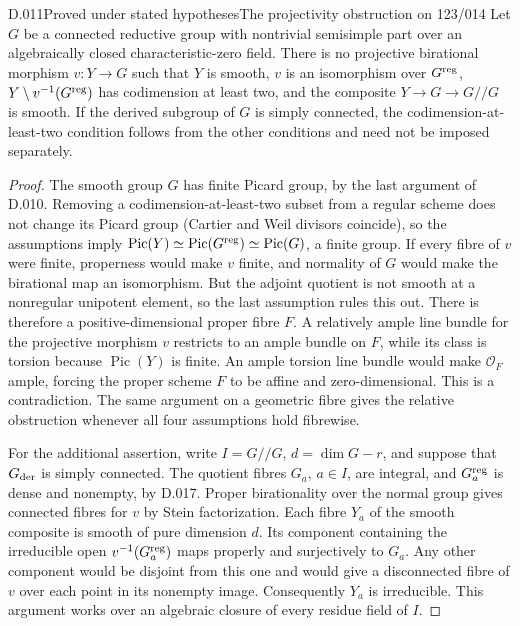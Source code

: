 \begin{saresult}{D.011}{Proved under stated hypotheses}{The projectivity obstruction on 123/014}
Let $G$ be a connected reductive group with nontrivial semisimple
part over an algebraically closed characteristic-zero field.
There is no projective birational morphism $v:Y\to G$ such that
$Y$ is smooth, $v$ is an isomorphism over $G^{\rm reg}$,
$Y\setminus v^{-1}(G^{\rm reg})$ has codimension at least two,
and the composite $Y\to G\to G/\!/G$ is smooth.
If the derived subgroup of $G$ is simply connected, the
codimension-at-least-two condition follows from the other
conditions and need not be imposed separately.
\end{saresult}
\begin{proof}
The smooth group $G$ has finite Picard group, by the last argument
of D.010.  Removing a codimension-at-least-two subset from a regular
scheme does not change its Picard group (Cartier and Weil divisors
coincide), so the assumptions imply
$\operatorname{Pic}(Y)\simeq\operatorname{Pic}(G^{\rm reg})
\simeq\operatorname{Pic}(G)$, a finite group.
If every fibre of $v$ were finite, properness would make $v$ finite,
and normality of $G$ would make the birational map an isomorphism.
But the adjoint quotient is not smooth at a nonregular unipotent
element, so the last assumption rules this out.  There is therefore
a positive-dimensional proper fibre $F$.  A relatively ample line
bundle for the projective morphism $v$ restricts to an ample bundle
on $F$, while its class is torsion because $\operatorname{Pic}(Y)$
is finite.  An ample torsion line bundle would make
$\mathcal O_F$ ample, forcing the proper scheme $F$ to be affine
and zero-dimensional.  This is a contradiction.  The same argument
on a geometric fibre gives the relative obstruction whenever all
four assumptions hold fibrewise.

For the additional assertion, write $I=G/\!/G$, $d=\dim G-r$,
and suppose that $G_{\rm der}$ is simply connected.
The quotient fibres $G_a$, $a\in I$, are integral, and
$G_a^{\rm reg}$ is dense and nonempty, by D.017.  Proper
birationality over the normal group gives connected fibres
for $v$ by Stein factorization.  Each fibre $Y_a$ of the
smooth composite is smooth of pure dimension $d$.  Its
component containing the irreducible open
$v^{-1}(G_a^{\rm reg})$ maps properly and surjectively to
$G_a$.  Any other component would be disjoint from this
one and would give a disconnected fibre of $v$ over each
point in its nonempty image.  Consequently $Y_a$ is
irreducible.  This argument works over an algebraic
closure of every residue field of $I$.


\end{proof}

